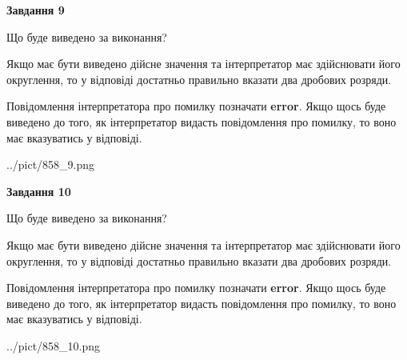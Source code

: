 \documentclass[12pt, ukrainian]{article}
\begin{document}
{\begin {Large}
{\begin {center}\textbf{Завдання 9}\end {center}}\par
Що буде виведено за виконання? \par

Якщо має бути виведено дійсне значення та інтерпретатор має здійснювати його округлення, 
то у відповіді достатньо правильно вказати два дробових розряди.

Повідомлення інтерпретатора про помилку позначати \textbf{error}.
Якщо щось буде виведено до того, як інтерпретатор видасть повідомлення про помилку, 
то воно має вказуватись у відповіді. \par

\begin{center}
	{../pict/858_9.png}
\end{center}
\newpage

{\begin {center}\textbf{Завдання 10}\end {center}}\par
Що буде виведено за виконання? \par

Якщо має бути виведено дійсне значення та інтерпретатор має здійснювати його округлення, 
то у відповіді достатньо правильно вказати два дробових розряди.

Повідомлення інтерпретатора про помилку позначати \textbf{error}.
Якщо щось буде виведено до того, як інтерпретатор видасть повідомлення про помилку, 
то воно має вказуватись у відповіді. \par

\begin{center}
	{../pict/858_10.png}
\end{center}
\newpage

\end {Large}}
\end{document}
